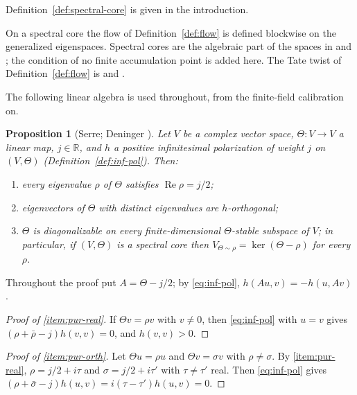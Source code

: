\documentclass[11pt]{amsart}
\theoremstyle{plain}
\newtheorem{proposition}[theorem]{Proposition}
\theoremstyle{definition}
\theoremstyle{remark}
\numberwithin{equation}{section}
\newcommand{\R}{\mathbb{R}}
\DeclareMathOperator{\Rea}{Re}
\renewcommand{\Re}{\Rea}
\begin{document}
Definition~\ref{def:spectral-core} is given in the introduction.

On a spectral core the flow of Definition~\ref{def:flow} is defined
blockwise on the generalized eigenspaces. Spectral cores are the
algebraic part of the spaces in
\cite[Definition~2.1(i), p.~521]{FlachMorin2020DeningerWeilArakelov}
and \cite[\S1]{Deninger1994Motivic}; the condition of no finite
accumulation point is added here. The Tate twist of
Definition~\ref{def:flow} is \cite[p.~168]{Deninger1998Analogies} and
\cite[p.~4]{Deninger2010HilbertPolya}.

The following linear algebra is used throughout, from the finite-field
calibration on.

\begin{proposition}[{Serre; Deninger
\cite[(7.11)--(7.13), pp.~32--33]{Deninger1994Motivic}}]%
\label{prop:purity}
Let $V$ be a complex vector space, $\Theta:V\to V$ a linear map,
$j\in\R$, and $h$ a positive infinitesimal polarization of weight $j$
on $(V,\Theta)$ (Definition~\ref{def:inf-pol}). Then:
\begin{enumerate}[label=(\roman*)]
\item\label{item:pur-real} every eigenvalue $\rho$ of $\Theta$ satisfies
  $\Re\rho=j/2$;
\item\label{item:pur-orth} eigenvectors of $\Theta$ with distinct
  eigenvalues are $h$-orthogonal;
\item\label{item:pur-ss} $\Theta$ is diagonalizable on every
  finite-dimensional $\Theta$-stable subspace of $V$; in particular, if
  $(V,\Theta)$ is a spectral core then $V_{\Theta\sim\rho}=
  \ker(\Theta-\rho)$ for every $\rho$.
\end{enumerate}
\end{proposition}

Throughout the proof put $A=\Theta-j/2$; by \eqref{eq:inf-pol},
$h(Au,v)=-h(u,Av)$.

\begin{proof}[Proof of \ref{item:pur-real}]
If $\Theta v=\rho v$ with $v\ne0$, then \eqref{eq:inf-pol} with $u=v$
gives $(\rho+\bar\rho-j)h(v,v)=0$, and $h(v,v)>0$.
\end{proof}

\begin{proof}[Proof of \ref{item:pur-orth}]
Let $\Theta u=\rho u$ and $\Theta v=\sigma v$ with $\rho\ne\sigma$. By
\ref{item:pur-real}, $\rho=j/2+i\tau$ and $\sigma=j/2+i\tau'$ with
$\tau\ne\tau'$ real. Then \eqref{eq:inf-pol} gives
$(\rho+\bar\sigma-j)h(u,v)=i(\tau-\tau')h(u,v)=0$.
\end{proof}
\end{document}
